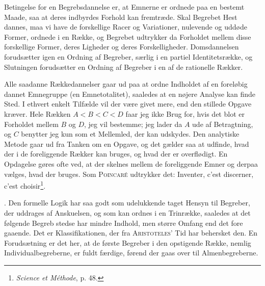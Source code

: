 \documentclass[12pt]{article}
\newcommand{\opage}[1]{\marginnote{\footnotesize\textit{[#1]}}}
\begin{document}
Betingelse for en Begrebsdannelse er, at Emnerne er ordnede paa en bestemt
Maade, saa at deres indbyrdes Forhold kan fremtræde. Skal Begrebet Hest dannes,
maa vi have de forskellige Racer og Variationer, nulevende og uddøde Former,
ordnede i en Række, og Begrebet udtrykker da Forholdet mellem disse forskellige
Former, deres Ligheder og deres Forskelligheder. Domsdannelsen forudsætter igen
en Ordning af Begreber, særlig i en partiel Identitetsrække, og Slutningen
forudsætter en Ordning af Begreber i en af de rationelle Rækker.

Alle saadanne Rækkedannelser gaar ud paa at ordne Indholdet af en foreløbig
dannet Emnegruppe (en Emnetotalitet), saaledes at en nøjere Analyse kan
finde Sted. I ethvert enkelt Tilfælde vil der være givet mere, end den stillede
Opgave kræver. Hele Rækken $A < B < C < D$ faar jeg ikke Brug for, hvis det blot er
Forholdet mellem $B$ og $D$, jeg vil bestemme; jeg lader da $A$ ude af Betragtning, og
$C$ benytter jeg kun som et Mellemled, der kan udskydes. Den analytiske Metode
gaar ud fra Tanken om en Opgave, og det gælder saa at udfinde, hvad der i de
foreliggende Rækker kan bruges, og hvad der er overflødigt. En Opdagelse gøres
ofte ved, at der skelnes mellem de foreliggende Emner og derpaa vælges, hvad der
bruges. Som \textsc{Poincaré} udtrykker det: Inventer, c'est discerner, c'est
choisir\footnote{\textit{Science et Méthode}, p. 48.}.

. Den formelle Logik har saa godt som udelukkende taget Hensyn til Begreber,
der uddrages af Anskuelsen, og som kan ordnes i en Trinrække, saaledes
at det følgende Begreb stedse har mindre Indhold, men større Omfang end det fore%
\setcounter{footnote}{0}%
\opage{33}gaaende. Det er Klassifikationen, der fra \textsc{Aristoteles}' Tid har behersket den. En
Forudsætning er det her, at de første Begreber i den opstigende Række, nemlig
Individualbegreberne, er fuldt færdige, førend der gaas over til Almenbegreberne.
\end{document}

